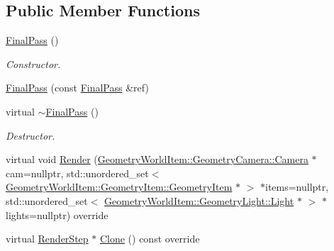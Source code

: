 \subsection*{Public Member Functions}
\begin{DoxyCompactItemize}
\item 
\mbox{\label{class_geometry_engine_1_1_geometry_render_step_1_1_final_pass_a2e669ce72a9c00a5d8307a5a70971501}} 
\mbox{\hyperlink{class_geometry_engine_1_1_geometry_render_step_1_1_final_pass_a2e669ce72a9c00a5d8307a5a70971501}{Final\+Pass}} ()
\begin{DoxyCompactList}\small\item\em Constructor. \end{DoxyCompactList}\item 
\mbox{\hyperlink{class_geometry_engine_1_1_geometry_render_step_1_1_final_pass_acc0c989f96b371cbbb7c87caf8ccf3f9}{Final\+Pass}} (const \mbox{\hyperlink{class_geometry_engine_1_1_geometry_render_step_1_1_final_pass}{Final\+Pass}} \&ref)
\item 
\mbox{\label{class_geometry_engine_1_1_geometry_render_step_1_1_final_pass_a5ee50bf11ee0f281074f4753d281d81f}} 
virtual \mbox{\hyperlink{class_geometry_engine_1_1_geometry_render_step_1_1_final_pass_a5ee50bf11ee0f281074f4753d281d81f}{$\sim$\+Final\+Pass}} ()
\begin{DoxyCompactList}\small\item\em Destructor. \end{DoxyCompactList}\item 
virtual void \mbox{\hyperlink{class_geometry_engine_1_1_geometry_render_step_1_1_final_pass_ad078d0e9d394754dbbd3cff871d72b9f}{Render}} (\mbox{\hyperlink{class_geometry_engine_1_1_geometry_world_item_1_1_geometry_camera_1_1_camera}{Geometry\+World\+Item\+::\+Geometry\+Camera\+::\+Camera}} $\ast$cam=nullptr, std\+::unordered\+\_\+set$<$ \mbox{\hyperlink{class_geometry_engine_1_1_geometry_world_item_1_1_geometry_item_1_1_geometry_item}{Geometry\+World\+Item\+::\+Geometry\+Item\+::\+Geometry\+Item}} $\ast$ $>$ $\ast$items=nullptr, std\+::unordered\+\_\+set$<$ \mbox{\hyperlink{class_geometry_engine_1_1_geometry_world_item_1_1_geometry_light_1_1_light}{Geometry\+World\+Item\+::\+Geometry\+Light\+::\+Light}} $\ast$ $>$ $\ast$lights=nullptr) override
\item 
virtual \mbox{\hyperlink{class_geometry_engine_1_1_geometry_render_step_1_1_render_step}{Render\+Step}} $\ast$ \mbox{\hyperlink{class_geometry_engine_1_1_geometry_render_step_1_1_final_pass_a6633ed9c32944cc390d2b0ab32225845}{Clone}} () const override
\end{DoxyCompactItemize}
